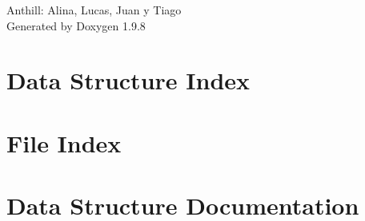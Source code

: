 \documentclass[twoside]{book}
\newcommand{\+}{\discretionary{\mbox{\scriptsize$\hookleftarrow$}}{}{}}
\newcommand{\clearemptydoublepage}{%
    \newpage{\pagestyle{empty}\cleardoublepage}%
  }
\begin{document}
  \raggedbottom
    \hypersetup{pageanchor=false,
                bookmarksnumbered=true,
                pdfencoding=unicode
               }
  \begin{titlepage}
  \vspace*{7cm}
  \begin{center}%
  {\Large Anthill\+: Alina, Lucas, Juan y Tiago}\\
  \vspace*{1cm}
  {\large Generated by Doxygen 1.9.8}\\
  \end{center}
  \end{titlepage}
  \clearemptydoublepage
  \tableofcontents
  \clearemptydoublepage
  \hypersetup{pageanchor=true}

\chapter{Data Structure Index}

\chapter{File Index}

\chapter{Data Structure Documentation}













\end{document}
